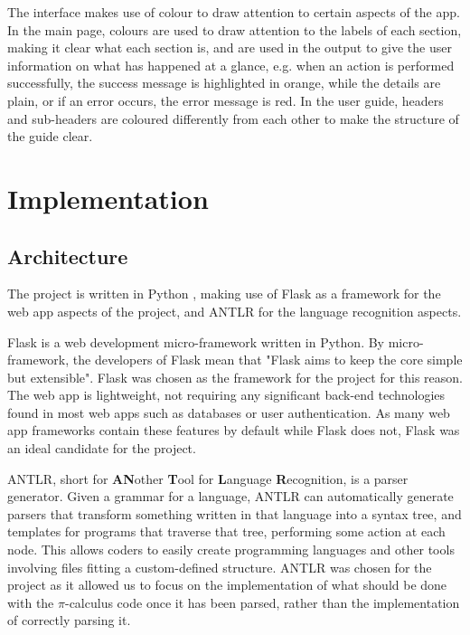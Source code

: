 \documentclass{l4proj}
\begin{document}
\quad The interface makes use of colour to draw attention to certain aspects of the app. In the main page, colours are used to draw attention to the labels of each section, making it clear what each section is, and are used in the output to give the user information on what has happened at a glance, e.g. when an action is performed successfully, the success message is highlighted in orange, while the details are plain, or if an error occurs, the error message is red. In the user guide, headers and sub-headers are coloured differently from each other to make the structure of the guide clear.


\chapter{Implementation}
\label{implement}

\section{Architecture}
\label{implArch}

\quad The project is written in Python \citep{Python}, making use of Flask as a framework for the web app aspects of the project, and ANTLR for the language recognition aspects.

\quad Flask is a web development micro-framework written in Python. By micro-framework, the developers of Flask mean that "Flask aims to keep the core simple but extensible". \citep{FlaskDocs} Flask was chosen as the framework for the project for this reason. The web app is lightweight, not requiring any significant back-end technologies found in most web apps such as databases or user authentication. As many web app frameworks contain these features by default while Flask does not, Flask was an ideal candidate for the project.

\quad ANTLR, short for \textbf{AN}other \textbf{T}ool for \textbf{L}anguage \textbf{R}ecognition, is a parser generator. \citep{Antlr} Given a grammar for a language, ANTLR can automatically generate parsers that transform something written in that language into a syntax tree, and templates for programs that traverse that tree, performing some action at each node. This allows coders to easily create programming languages and other tools involving files fitting a custom-defined structure. ANTLR was chosen for the project as it allowed us to focus on the implementation of what should be done with the $\pi$-calculus code once it has been parsed, rather than the implementation of correctly parsing it.
\end{document}
